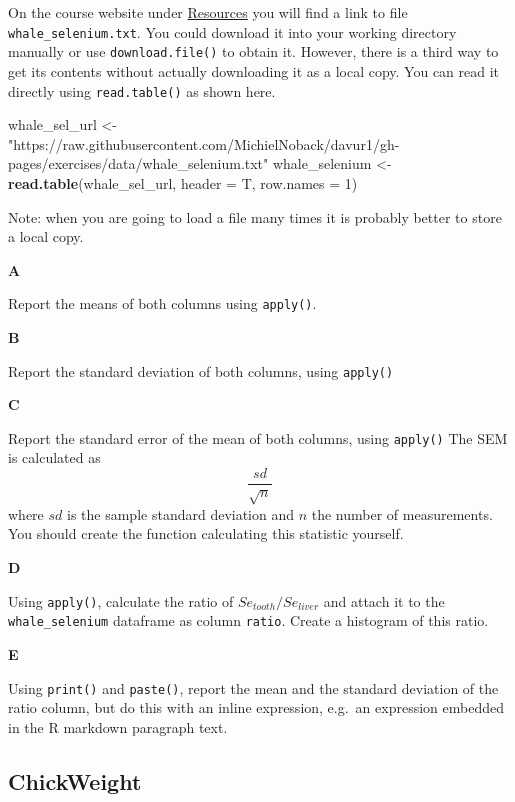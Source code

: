 \documentclass[]{book}
\newenvironment{Shaded}{\begin{snugshade}}{\end{snugshade}}
\newcommand{\DataTypeTok}[1]{\textcolor[rgb]{0.13,0.29,0.53}{#1}}
\newcommand{\DecValTok}[1]{\textcolor[rgb]{0.00,0.00,0.81}{#1}}
\newcommand{\KeywordTok}[1]{\textcolor[rgb]{0.13,0.29,0.53}{\textbf{#1}}}
\newcommand{\NormalTok}[1]{#1}
\newcommand{\StringTok}[1]{\textcolor[rgb]{0.31,0.60,0.02}{#1}}
\begin{document}
On the course website under \href{https://michielnoback.github.io/bincourses/course_contents/davur/resources.html}{Resources} you will find a link to file \texttt{whale\_selenium.txt}. You could download it into your working directory manually or use \texttt{download.file()} to obtain it. However, there is a third way to get its contents without actually downloading it as a local copy. You can read it directly using \texttt{read.table()} as shown here.

\begin{Shaded}
\begin{Highlighting}[]
\NormalTok{whale_sel_url <-}\StringTok{ "https://raw.githubusercontent.com/MichielNoback/davur1/gh-pages/exercises/data/whale_selenium.txt"}
\NormalTok{whale_selenium <-}\StringTok{ }\KeywordTok{read.table}\NormalTok{(whale_sel_url,}
    \DataTypeTok{header =}\NormalTok{ T,}
    \DataTypeTok{row.names =} \DecValTok{1}\NormalTok{)}
\end{Highlighting}
\end{Shaded}

Note: when you are going to load a file many times it is probably better to store a local copy.

\textbf{A}

Report the means of both columns using \texttt{apply()}.

\textbf{B}

Report the standard deviation of both columns, using \texttt{apply()}

\textbf{C}

Report the standard error of the mean of both columns, using \texttt{apply()} The SEM is calculated as \[\frac{sd}{\sqrt{n}}\] where \(sd\) is the sample standard deviation and \(n\) the number of measurements. You should create the function calculating this statistic yourself.

\textbf{D}

Using \texttt{apply()}, calculate the ratio of \(Se_{tooth} / Se_{liver}\) and attach it to the \texttt{whale\_selenium} dataframe as column \texttt{ratio}. Create a histogram of this ratio.

\textbf{E}

Using \texttt{print()} and \texttt{paste()}, report the mean and the standard deviation of the ratio column, but do this with an inline expression, e.g.~an expression embedded in the R markdown paragraph text.

\hypertarget{chickweight}{%
\subsection{ChickWeight}\label{chickweight}}
\end{document}
